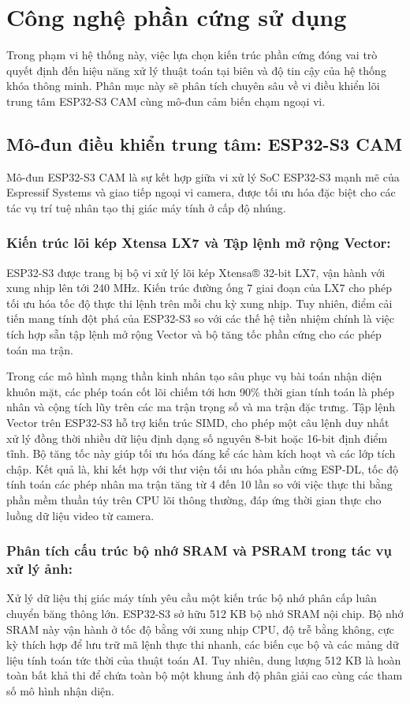 \section{Công nghệ phần cứng sử dụng}

Trong phạm vi hệ thống này, việc lựa chọn kiến trúc phần cứng đóng vai trò quyết định đến hiệu năng xử lý thuật toán tại biên và độ tin cậy của hệ thống khóa thông minh. Phân mục này sẽ phân tích chuyên sâu về vi điều khiển lõi trung tâm ESP32-S3 CAM cùng mô-đun cảm biến chạm ngoại vi.

\subsection{Mô-đun điều khiển trung tâm: ESP32-S3 CAM}

Mô-đun ESP32-S3 CAM là sự kết hợp giữa vi xử lý SoC ESP32-S3 mạnh mẽ của Espressif Systems và giao tiếp ngoại vi camera, được tối ưu hóa đặc biệt cho các tác vụ trí tuệ nhân tạo thị giác máy tính ở cấp độ nhúng.

\subsubsection{Kiến trúc lõi kép Xtensa LX7 và Tập lệnh mở rộng Vector:}
ESP32-S3 được trang bị bộ vi xử lý lõi kép Xtensa® 32-bit LX7, vận hành với xung nhịp lên tới 240 MHz. Kiến trúc đường ống 7 giai đoạn của LX7 cho phép tối ưu hóa tốc độ thực thi lệnh trên mỗi chu kỳ xung nhịp. Tuy nhiên, điểm cải tiến mang tính đột phá của ESP32-S3 so với các thế hệ tiền nhiệm chính là việc tích hợp sẵn tập lệnh mở rộng Vector và bộ tăng tốc phần cứng cho các phép toán ma trận.

Trong các mô hình mạng thần kinh nhân tạo sâu phục vụ bài toán nhận diện khuôn mặt, các phép toán cốt lõi chiếm tới hơn 90\% thời gian tính toán là phép nhân và cộng tích lũy trên các ma trận trọng số và ma trận đặc trưng. Tập lệnh Vector trên ESP32-S3 hỗ trợ kiến trúc SIMD, cho phép một câu lệnh duy nhất xử lý đồng thời nhiều dữ liệu định dạng số nguyên 8-bit hoặc 16-bit định điểm tĩnh. Bộ tăng tốc này giúp tối ưu hóa đáng kể các hàm kích hoạt và các lớp tích chập. Kết quả là, khi kết hợp với thư viện tối ưu hóa phần cứng ESP-DL, tốc độ tính toán các phép nhân ma trận tăng từ 4 đến 10 lần so với việc thực thi bằng phần mềm thuần túy trên CPU lõi thông thường, đáp ứng thời gian thực cho luồng dữ liệu video từ camera.

\subsubsection{Phân tích cấu trúc bộ nhớ SRAM và PSRAM trong tác vụ xử lý ảnh:}
Xử lý dữ liệu thị giác máy tính yêu cầu một kiến trúc bộ nhớ phân cấp luân chuyển băng thông lớn. ESP32-S3 sở hữu 512 KB bộ nhớ SRAM nội chip. Bộ nhớ SRAM này vận hành ở tốc độ bằng với xung nhịp CPU, độ trễ bằng không, cực kỳ thích hợp để lưu trữ mã lệnh thực thi nhanh, các biến cục bộ và các mảng dữ liệu tính toán tức thời của thuật toán AI. Tuy nhiên, dung lượng 512 KB là hoàn toàn bất khả thi để chứa toàn bộ một khung ảnh độ phân giải cao cùng các tham số mô hình nhận diện.

